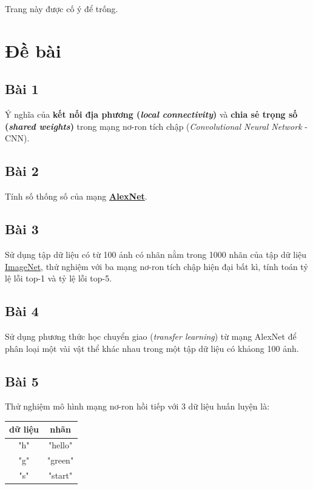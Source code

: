 \documentclass[a4paper]{article}
\begin{document}
\newpage
\tableofcontents
\newpage
\vspace*{\fill}
{\centering Trang này được cố ý để trống.\par}
\vspace{\fill}
\newpage

\section{Đề bài}

\subsection{Bài 1} Ý nghĩa của \textbf{kết nối địa phương (\textit{local connectivity})} và \textbf{chia sẻ trọng số (\textit{shared weights})} trong mạng nơ-ron tích chập (\textit{Convolutional Neural Network} - CNN).
\subsection{Bài 2} Tính số thống số của mạng \href{https://en.wikipedia.org/wiki/AlexNet}{\textbf{AlexNet}}.
\subsection{Bài 3} Sử dụng tập dữ liệu có từ 100 ảnh có nhãn nằm trong 1000 nhãn của tập dữ liệu \href{http://www.image-net.org/download}{ImageNet}, thử nghiệm với ba mạng nơ-ron tích chập hiện đại bất kì, tính toán tỷ lệ lỗi top-1 và tỷ lệ lỗi top-5.
\subsection{Bài 4} Sử dụng phương thức học chuyển giao (\textit{transfer learning}) từ mạng AlexNet để phân loại một vài vật thể khác nhau trong một tập dữ liệu có khảong 100 ảnh.
\subsection{Bài 5} Thử nghiệm mô hình mạng nơ-ron hồi tiếp với 3 dữ liệu huấn luyện là:
\begin{table}[!h]
\centering
\begin{tabular}{|c|c|}
\hline
\textbf{dữ liệu} & \textbf{nhãn} \\ \hline
"h"              & "hello"       \\ \hline
"g"              & "green"       \\ \hline
"s"              & "start"       \\ \hline
\end{tabular}
\end{table}
\end{document}
